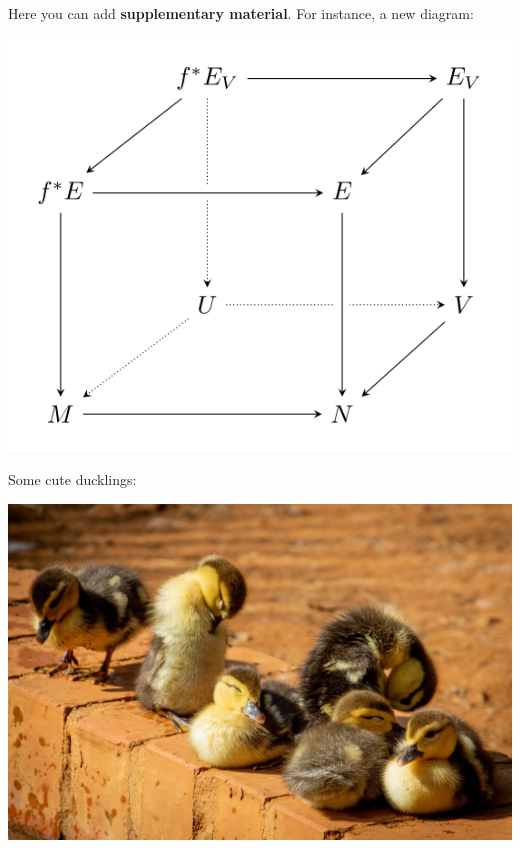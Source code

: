 \documentclass[a0paper,fleqn]{betterposter}
\begin{document}
{Here you can add \textbf{supplementary material}. For instance, a new diagram:
\begin{center}
\includegraphics[width=\textwidth]{img/tikzexample2}
\end{center}

Some cute ducklings:
\begin{center}
\includegraphics[width=\textwidth]{img/ducklings}
\end{center}
}
\end{document}
